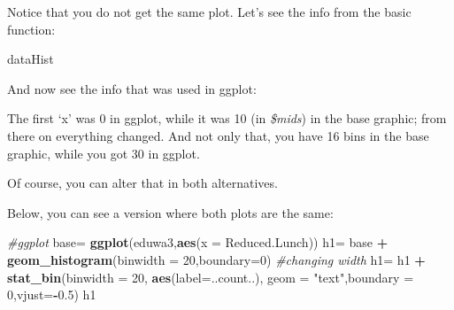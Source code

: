 \documentclass[]{article}
\newenvironment{Shaded}{\begin{snugshade}}{\end{snugshade}}
\newcommand{\KeywordTok}[1]{\textcolor[rgb]{0.13,0.29,0.53}{\textbf{#1}}}
\newcommand{\DataTypeTok}[1]{\textcolor[rgb]{0.13,0.29,0.53}{#1}}
\newcommand{\DecValTok}[1]{\textcolor[rgb]{0.00,0.00,0.81}{#1}}
\newcommand{\FloatTok}[1]{\textcolor[rgb]{0.00,0.00,0.81}{#1}}
\newcommand{\StringTok}[1]{\textcolor[rgb]{0.31,0.60,0.02}{#1}}
\newcommand{\CommentTok}[1]{\textcolor[rgb]{0.56,0.35,0.01}{\textit{#1}}}
\newcommand{\OperatorTok}[1]{\textcolor[rgb]{0.81,0.36,0.00}{\textbf{#1}}}
\newcommand{\NormalTok}[1]{#1}
\begin{document}
Notice that you do not get the same plot. Let's see the info from the
basic function:

\begin{Shaded}
\begin{Highlighting}[]
\NormalTok{dataHist}
\end{Highlighting}
\end{Shaded}

And now see the info that was used in ggplot:

\begin{Shaded}
\end{Shaded}

The first `x' was 0 in ggplot, while it was 10 (in \emph{\$mids}) in the
base graphic; from there on everything changed. And not only that, you
have 16 bins in the base graphic, while you got 30 in ggplot.

Of course, you can alter that in both alternatives.

Below, you can see a version where both plots are the same:

\begin{Shaded}
\begin{Highlighting}[]
\CommentTok{#ggplot}
\NormalTok{base=}\StringTok{ }\KeywordTok{ggplot}\NormalTok{(eduwa3,}\KeywordTok{aes}\NormalTok{(}\DataTypeTok{x =}\NormalTok{ Reduced.Lunch))  }
\NormalTok{h1=}\StringTok{ }\NormalTok{base }\OperatorTok{+}\StringTok{ }\KeywordTok{geom_histogram}\NormalTok{(}\DataTypeTok{binwidth =} \DecValTok{20}\NormalTok{,}\DataTypeTok{boundary=}\DecValTok{0}\NormalTok{) }\CommentTok{#changing width}
\NormalTok{h1=}\StringTok{ }\NormalTok{h1 }\OperatorTok{+}\StringTok{ }\KeywordTok{stat_bin}\NormalTok{(}\DataTypeTok{binwidth =} \DecValTok{20}\NormalTok{, }\KeywordTok{aes}\NormalTok{(}\DataTypeTok{label=}\NormalTok{..count..), }
                  \DataTypeTok{geom =} \StringTok{"text"}\NormalTok{,}\DataTypeTok{boundary =} \DecValTok{0}\NormalTok{,}\DataTypeTok{vjust=}\OperatorTok{-}\FloatTok{0.5}\NormalTok{)}
\NormalTok{h1}
\end{Highlighting}
\end{Shaded}

\begin{Shaded}
\end{Shaded}
\end{document}
